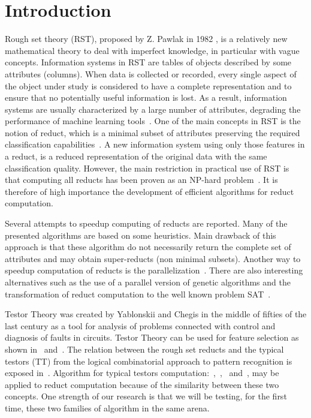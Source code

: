 \documentclass[authoryear,11pt]{elsarticle}
\begin{document}
\section{Introduction}
  Rough set theory (RST), proposed by Z. Pawlak in 1982 \citep{Pawlak81,Pawlak81-2,Pawlak82,Pawlak91}, 
  is a relatively new mathematical theory 
  to deal with imperfect knowledge, in particular with vague concepts. Information systems in RST 
  are tables of objects described by some attributes (columns). 
  When data is collected or recorded, every single aspect of the object under study is considered 
  to have a complete representation and to ensure that no potentially useful information is lost.
  As a result, information systems are usually characterized by a large number of attributes,
  degrading the performance of machine learning tools~\citep{Parthalain08}.
  One of the main concepts in RST is the notion of reduct, which is a minimal subset of attributes 
  preserving the required classification capabilities~\citep{Pawlak91}. A new information system using 
  only those features in a reduct, is a reduced representation of the original data with the same 
  classification quality. 
  However, the main restriction in practical use of RST is that computing all reducts has been proven 
  as an NP-hard problem~\citep{Skowron92}.
  It is therefore of high importance the development of efficient algorithms for reduct computation.
  
  Several attempts to speedup computing of reducts are reported. Many of the presented algorithms are 
  based on some heuristics. Main drawback of this approach is that these algorithm do not necessarily 
  return the complete set of attributes and may obtain super-reducts (non minimal subsets). Another 
  way to speedup computation of reducts is the parallelization~\citep{Strakowski08}. There are also 
  interesting alternatives such as the use of a parallel version of genetic algorithms \citep{Wroblewski98}
  and the transformation of reduct computation to the well known problem SAT~\citep{Jensen14}.
  
  Testor Theory was created by Yablonskii and Chegis in the middle of fifties 
  of the last century as a tool for analysis of problems connected with control and 
  diagnosis of faults in circuits. Testor Theory can be used for feature selection as shown in~\citep{Ruiz08}
  and~\citep{Martinez01}. The relation between the rough set reducts and the typical testors (TT) from the
  logical combinatorial approach to pattern recognition is exposed in~\citep{Lazo15}. Algorithm for
  typical testors computation:~\citep{Ruiz85},~\citep{Santiesteban03},~\citep{Sanchez07} and~\citep{Lias09},
  may be applied to reduct computation because of the similarity between these two concepts. One strength 
  of our research is that we will be testing, for the first time, these two families of algorithm in the 
  same arena.
     
\end{document}
